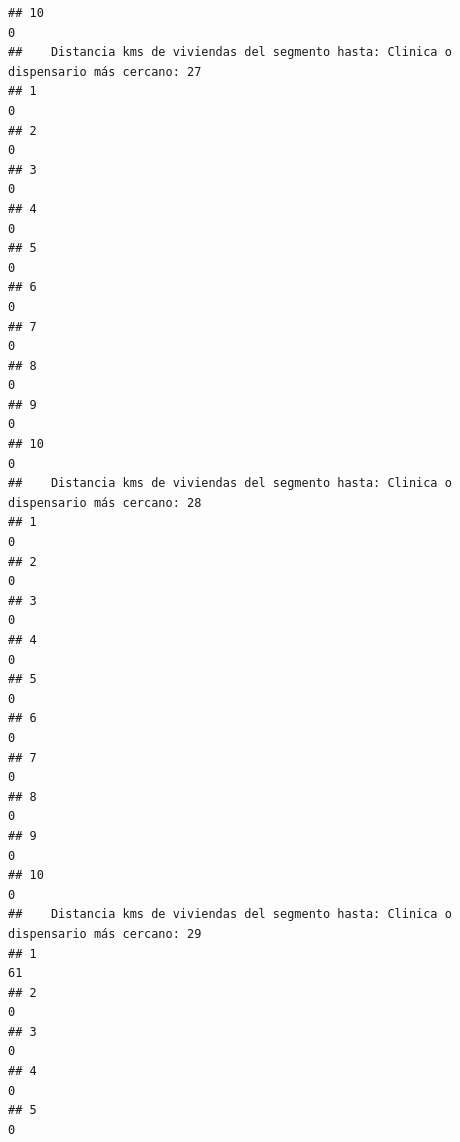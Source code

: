 \documentclass[11pt,]{article}
\begin{document}
\begin{verbatim}
## 10                                                                                    0
##    Distancia kms de viviendas del segmento hasta: Clinica o dispensario más cercano: 27
## 1                                                                                     0
## 2                                                                                     0
## 3                                                                                     0
## 4                                                                                     0
## 5                                                                                     0
## 6                                                                                     0
## 7                                                                                     0
## 8                                                                                     0
## 9                                                                                     0
## 10                                                                                    0
##    Distancia kms de viviendas del segmento hasta: Clinica o dispensario más cercano: 28
## 1                                                                                     0
## 2                                                                                     0
## 3                                                                                     0
## 4                                                                                     0
## 5                                                                                     0
## 6                                                                                     0
## 7                                                                                     0
## 8                                                                                     0
## 9                                                                                     0
## 10                                                                                    0
##    Distancia kms de viviendas del segmento hasta: Clinica o dispensario más cercano: 29
## 1                                                                                    61
## 2                                                                                     0
## 3                                                                                     0
## 4                                                                                     0
## 5                                                                                     0

\end{verbatim}
\end{document}
